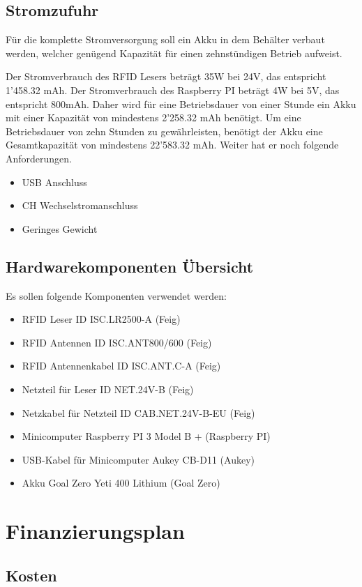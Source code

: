 \section{Stromzufuhr}
Für die komplette Stromversorgung soll ein Akku in dem Behälter verbaut werden, welcher genügend Kapazität für einen zehnstündigen Betrieb aufweist.

Der Stromverbrauch des RFID Lesers beträgt 35W bei 24V, das entspricht 1'458.32 mAh.
Der Stromverbrauch des Raspberry PI beträgt 4W bei 5V, das entspricht 800mAh.
Daher wird für eine Betriebsdauer von einer Stunde ein Akku mit einer Kapazität von mindestens 2'258.32 mAh benötigt. Um eine Betriebsdauer von zehn Stunden zu gewährleisten, benötigt der Akku eine Gesamtkapazität von mindestens 22'583.32 mAh.
Weiter hat er noch folgende Anforderungen.
\begin{itemize}
	\item USB Anschluss
	\item CH Wechselstromanschluss
	\item Geringes Gewicht
\end{itemize}

\section{Hardwarekomponenten Übersicht}
Es sollen folgende Komponenten verwendet werden:
\begin{itemize}
	\item RFID Leser ID ISC.LR2500-A  (Feig)
	\item RFID Antennen ID ISC.ANT800/600 (Feig)
	\item RFID Antennenkabel ID ISC.ANT.C-A (Feig)
	\item Netzteil für Leser ID NET.24V-B (Feig)
	\item Netzkabel für Netzteil ID CAB.NET.24V-B-EU  (Feig)
	\item Minicomputer Raspberry PI 3 Model B + (Raspberry PI)
	\item USB-Kabel für Minicomputer Aukey CB-D11 (Aukey)
	\item Akku Goal Zero Yeti 400 Lithium (Goal Zero)
\end{itemize}

\chapter{Finanzierungsplan}

\section{Kosten}

